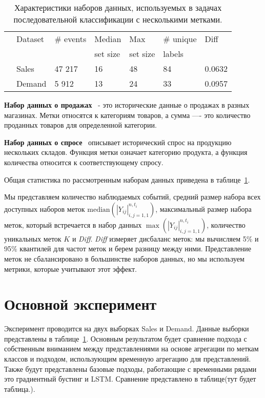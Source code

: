\documentclass[a4paper, 12pt]{article} %
\begin{document}
\begin{table}[t!]
\centering
\begin{tabular}{p{0.3cm}p{2.2cm}p{1.7cm}p{1.6cm}p{1.6cm}p{1.8cm}p{1.1cm}}
\hline
& Dataset & \# events & Median & Max & \# unique & Diff \\
& &  & set size & set size &  labels \\
\hline
& Sales & 47 217 & 16 & 48  & 84 & 0.0632 \\
& Demand & 5 912 & 13 & 24  & 33 & 0.0957 \\
\hline
\end{tabular}
\caption{Характеристики наборов данных, используемых в задачах последовательной классификации с несколькими метками.}
\label{tab:multi_datasets}
\end{table}

\textbf{Набор данных о продажах}~\cite{sales} - это исторические данные о продажах в разных магазинах. Метки относятся к категориям товаров, а сумма ---- это количество проданных товаров для определенной категории. 

\textbf{Набор данных о спросе}~\cite{demand} описывает исторический спрос на продукцию нескольких складов. Функция метки означает категорию продукта, а функция количества относится к соответствующему спросу.

Общая статистика по рассмотренным наборам данных приведена в таблице~\ref{tab:multi_datasets}.

Мы представляем количество наблюдаемых событий, средний размер набора всех доступных наборов меток $\mathrm{median}({|Y_{ij}|}_{i, j = 1, 1}^{n, t_i})$, максимальный размер набора меток, который встречается в набор данных $\max({|Y_{ij}|}_{i, j = 1, 1}^{n, t_i})$, количество уникальных меток $K$ и \textit{Diff}. 
\textit{Diff} измеряет дисбаланс меток: мы вычисляем 5$\%$ и 95$\%$ квантилей для частот меток и берем разницу между ними.
Представление меток не сбалансировано в большинстве наборов данных, но мы используем метрики, которые учитывают этот эффект.

\section{Основной эксперимент}
Эксперимент проводится на двух выборках Sales и Demand. Данные выборки представлены в таблице~\ref{tab:multi_datasets}. Основным результатом будет сравнение подхода  с собственным вниманием между представлениями на основе агрегации по меткам классов и подходом, использующим временную агрегацию для представлений. Также будут представлены базовые подходы, работающие с временными рядами это градиентный бустинг и LSTM. Сравнение представлено в таблице(тут будет таблица.).  
\end{document}

